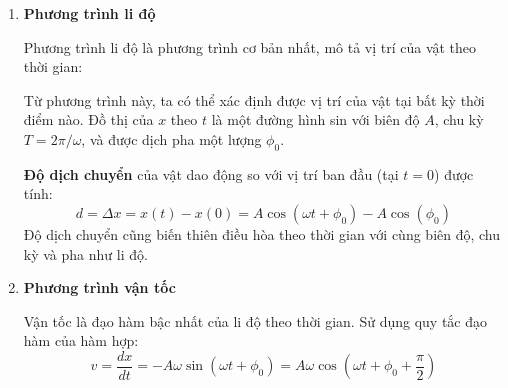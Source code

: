 \begin{enumerate}[label=\alph*)]
    \item \textbf{Phương trình li độ}

    Phương trình li độ là phương trình cơ bản nhất, mô tả vị trí của vật theo thời gian:

    \begin{center}
    \end{center}

    Từ phương trình này, ta có thể xác định được vị trí của vật tại bất kỳ thời điểm nào. Đồ thị của $x$ theo $t$ là một đường hình sin với biên độ $A$, chu kỳ $T = 2\pi/\omega$, và được dịch pha một lượng $\phi_0$.

    \textbf{Độ dịch chuyển} của vật dao động so với vị trí ban đầu (tại $t = 0$) được tính:
    \[
        d = \Delta x = x(t) - x(0) = A\cos(\omega t + \phi_0) - A\cos(\phi_0)
    \]
    Độ dịch chuyển cũng biến thiên điều hòa theo thời gian với cùng biên độ, chu kỳ và pha như li độ.

    \item \textbf{Phương trình vận tốc}

    Vận tốc là đạo hàm bậc nhất của li độ theo thời gian. Sử dụng quy tắc đạo hàm của hàm hợp:
    \[
        v = \frac{dx}{dt} = -A\omega\sin(\omega t + \phi_0) = A\omega\cos\left(\omega t + \phi_0 + \frac{\pi}{2}\right)
    \]


\end{enumerate}
